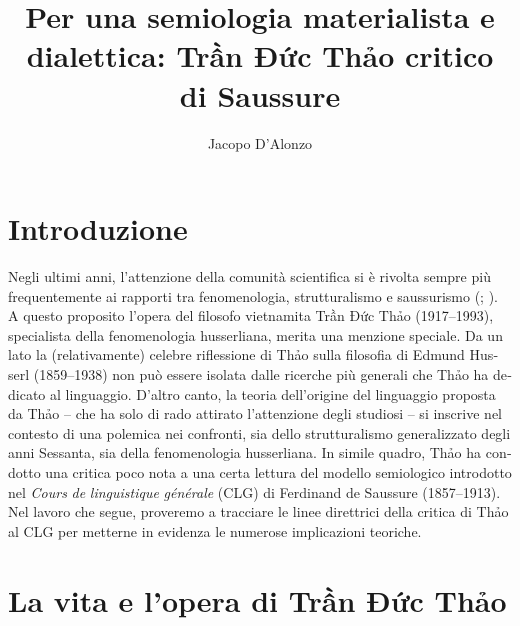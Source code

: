 \documentclass[output=paper]{langsci/langscibook}
\author{Jacopo D’Alonzo\affiliation{Sapienza Università di Roma}\orcid{}}
\title{Per una semiologia materialista e dialettica: Trần Đức Thảo critico di Saussure}
\begin{document}
\begin{otherlanguage}{italian}
\maketitle

\section{Introduzione} 

 Negli ultimi anni, l’attenzione della comunità scientifica si è rivolta sempre più frequentemente ai rapporti tra fenomenologia, strutturalismo e saussurismo (\citealt{de_palo_saussure_2016}; \citealt{aurora_filosofia_2017}). A questo proposito l’opera del filosofo vietnamita Trần Đức Thảo (1917--1993), specialista della fenomenologia husserliana, merita una menzione speciale. Da un lato la (relativamente) celebre riflessione di Thảo sulla filosofia di Edmund Husserl (1859--1938) non può essere isolata dalle ricerche più generali che Thảo ha dedicato al linguaggio. D’altro canto, la teoria dell’origine del linguaggio proposta da Thảo – che ha solo di rado attirato l’attenzione degli studiosi – si inscrive nel contesto di una polemica nei confronti, sia dello strutturalismo generalizzato degli anni Sessanta, sia della fenomenologia husserliana. In simile quadro, Thảo ha condotto una critica poco nota a una certa lettura del modello semiologico introdotto nel \textit{Cours} \textit{de} \textit{linguistique} \textit{générale} (CLG) di Ferdinand de Saussure (1857--1913). Nel lavoro che segue, proveremo a tracciare le linee direttrici della critica di Thảo al CLG per metterne in evidenza le numerose implicazioni teoriche.

\section{La vita e l’opera di Trần Đức Thảo} 


\end{otherlanguage}
\end{document}
